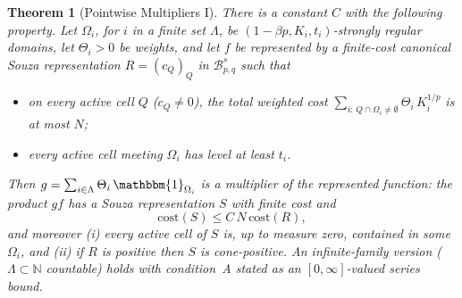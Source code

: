 \documentclass[11pt]{amsart}
\newtheorem{theorem}{Theorem}[section]
\theoremstyle{definition}
\begin{document}
\begin{theorem}[Pointwise Multipliers I]\label{pm1}
There is a constant $C$ with the following property. Let $\Omega_i$, for
$i$ in a finite set $\Lambda$, be $(1-\beta p, K_i, t_i)$-strongly regular
domains, let $\Theta_i > 0$ be weights, and let $f$ be represented by a
finite-cost canonical Souza representation $R = (c_Q)_Q$ in
$\mathcal{B}^s_{p,q}$ such that
\begin{itemize}
\item[A.] on every active cell $Q$ ($c_Q \neq 0$), the total weighted cost
$\sum_{i\colon\, Q \cap \Omega_i \neq \emptyset} \Theta_i\, K_i^{1/p}$ is at
most $N$;
\item[B.] every active cell meeting $\Omega_i$ has level at least $t_i$.
\end{itemize}
Then $g = \sum_{i \in \Lambda} \Theta_i\, \mathbbm{1}_{\Omega_i}$ is a
multiplier of the represented function: the product $g f$ has a Souza
representation $S$ with finite cost and
$$\mathrm{cost}(S) \leq C\, N\, \mathrm{cost}(R),$$
and moreover (i) every active cell of $S$ is, up to measure zero, contained
in some $\Omega_i$, and (ii) if $R$ is positive then $S$ is cone-positive.
An infinite-family version ($\Lambda \subset \mathbb{N}$ countable) holds
with condition~A stated as an $[0,\infty]$-valued series bound.
\end{theorem}
\end{document}
